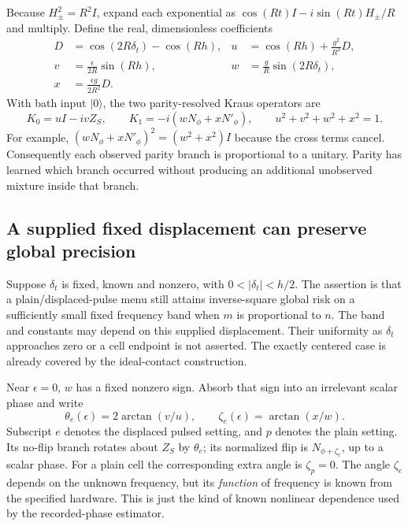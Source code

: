 \documentclass[11pt,a4paper]{article}
\numberwithin{equation}{section}
\theoremstyle{remark}
\begin{document}
Because $H_\pm^2=R^2I$, expand each exponential as
$\cos(Rt)I-i\sin(Rt)H_\pm/R$ and multiply. Define the real, dimensionless
coefficients
\begin{align}
 D&=\cos(2R\delta_t)-\cos(Rh),
 &u&=\cos(Rh)+\frac{g^2}{R^2}D,\nonumber\\
 v&=\frac{\epsilon}{2R}\sin(Rh),
 &w&=\frac{g}{R}\sin(2R\delta_t),\nonumber\\
 x&=\frac{\epsilon g}{2R^2}D.
 \label{tim:coefficients}
\end{align}
With bath input $|0\rangle$, the two parity-resolved Kraus operators are
\begin{equation}
 K_0=uI-ivZ_S,\qquad
 K_1=-i(wN_\phi+xN'_\phi),\qquad
 u^2+v^2+w^2+x^2=1.
 \label{tim:fixed-instrument}
\end{equation}
For example,
$(wN_\phi+xN'_\phi)^2=(w^2+x^2)I$ because the cross terms cancel.
Consequently each observed parity branch is proportional to a unitary.
Parity has learned which branch occurred without producing an additional
unobserved mixture inside that branch.

\subsection{A supplied fixed displacement can preserve global precision}

Suppose $\delta_t$ is fixed, known and nonzero, with $0<|\delta_t|<h/2$.
The assertion is that a plain/displaced-pulse menu still attains
inverse-square global risk on a sufficiently small fixed frequency band
when $m$ is proportional to $n$. The band and constants may depend on this
supplied displacement. Their uniformity as $\delta_t$ approaches zero or a
cell endpoint is not asserted. The exactly centered case is already covered
by the ideal-contact construction.

Near $\epsilon=0$, $w$ has a fixed nonzero sign. Absorb that sign into an
irrelevant scalar phase and write
\begin{equation}
 \theta_e(\epsilon)=2\arctan(v/u),\qquad
 \zeta_e(\epsilon)=\arctan(x/w).
\end{equation}
Subscript $e$ denotes the displaced pulsed setting, and $p$ denotes the
plain setting. Its no-flip branch rotates about $Z_S$ by $\theta_e$; its
normalized flip is $N_{\phi+\zeta_e}$, up to a scalar phase. For a plain
cell the corresponding extra angle is $\zeta_p=0$.
The angle $\zeta_e$ depends on the unknown frequency, but its \emph{function}
of frequency is known from the specified hardware. This is just the kind of
known nonlinear dependence used by the recorded-phase estimator.
\end{document}
